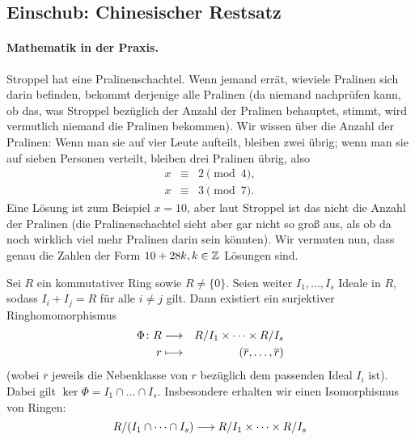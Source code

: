 \documentclass[12pt,a4paper]{scrartcl}
\begin{document}
\subsection{Einschub: Chinesischer Restsatz}
\paragraph{Mathematik in der Praxis.}
Stroppel hat eine Pralinenschachtel. Wenn jemand errät, wieviele Pralinen sich darin befinden, bekommt derjenige alle Pralinen (da niemand nachprüfen kann, ob das, was Stroppel bezüglich der Anzahl der Pralinen behauptet, stimmt, wird vermutlich niemand die Pralinen bekommen). Wir wissen über die Anzahl der Pralinen: Wenn man sie auf vier Leute aufteilt, bleiben zwei übrig; wenn man sie auf sieben Personen verteilt, bleiben drei Pralinen übrig, also
\begin{eqnarray*}
	x &\equiv & 2 \pmod 4,\\
	x &\equiv & 3 \pmod 7.
\end{eqnarray*}
Eine Lösung ist zum Beispiel $x = 10$, aber laut Stroppel ist das nicht die Anzahl der Pralinen (die Pralinenschachtel sieht aber gar nicht so groß aus, als ob da noch wirklich viel mehr Pralinen darin sein könnten). Wir vermuten nun, dass genau die Zahlen der Form $10+28k, k\in\mathbb Z$ Lösungen sind.

\begin{satz}
	Sei $R$ ein kommutativer Ring sowie $R\neq\{0\}$. Seien weiter $I_1,\dots,I_s$ Ideale in $R$, sodass $I_i+I_j = R$ für alle $i\neq j$ gilt. Dann existiert ein surjektiver Ringhomomorphismus
	\begin{eqnarray*}
		\Phi\colon R & \longrightarrow & R/I_1\times \dots \times R/I_s\\
		r & \longmapsto & (\overline{r},\dots, \overline{r})
	\end{eqnarray*}
	\textup(wobei $\overline{r}$ jeweils die Nebenklasse von $r$ bezüglich dem passenden Ideal $I_i$ ist\textup).
	Dabei gilt $\ker\Phi = I_1\cap\dots\cap I_s$. Insbesondere erhalten wir einen Isomorphismus von Ringen:
	$$ R/(I_1\cap\dots\cap I_s) \longrightarrow R/I_1 \times\dots \times R/I_s$$
	
\end{satz}
\end{document}
